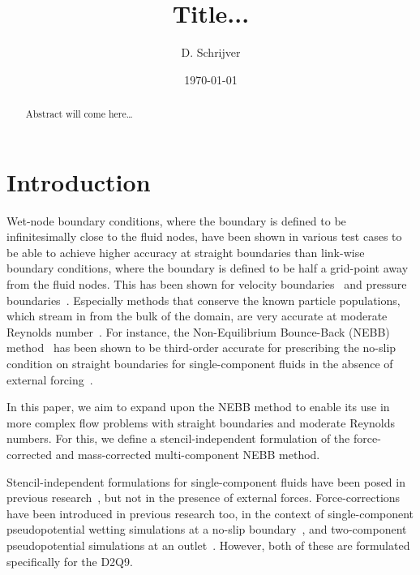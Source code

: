 \documentclass[aps,physrev,twocolumn,10pt]{revtex4-2}
\begin{document}
\title{Title...}

\author{D. Schrijver}

\date{\today}

\begin{abstract}
Abstract will come here\dots
\end{abstract}

\maketitle

\section{\label{sec:Introduction}Introduction}
Wet-node boundary conditions, where the boundary is defined to be infinitesimally close to the fluid nodes, have been shown in various test cases to be able to achieve higher accuracy at straight boundaries than link-wise boundary conditions, where the boundary is defined to be half a grid-point away from the fluid nodes. This has been shown for velocity boundaries~\cite{latt_straight_2008} and pressure boundaries~\cite{zou_pressure_1997}. Especially methods that conserve the known particle populations, which stream in from the bulk of the domain, are very accurate at moderate Reynolds number~\cite{latt_straight_2008}. For instance, the Non-Equilibrium Bounce-Back (NEBB) method~\cite{zou_pressure_1997} has been shown to be third-order accurate for prescribing the no-slip condition on straight boundaries for single-component fluids in the absence of external forcing~\cite{kruger_lattice_2017}. 

In this paper, we aim to expand upon the NEBB method to enable its use in more complex flow problems with straight boundaries and moderate Reynolds numbers. For this, we define a stencil-independent formulation of the force-corrected and mass-corrected multi-component NEBB method. 

Stencil-independent formulations for single-component fluids have been posed in previous research~\cite{kruger_lattice_2017}\cite{klass_non-equilibrium_2021}, but not in the presence of external forces. Force-corrections have been introduced in previous research too, in the context of single-component pseudopotential wetting simulations at a no-slip boundary~\cite{khajepor_study_2019}, and two-component pseudopotential simulations at an outlet~\cite{wang_two_2022}. However, both of these are formulated specifically for the D2Q9. 
\end{document}
